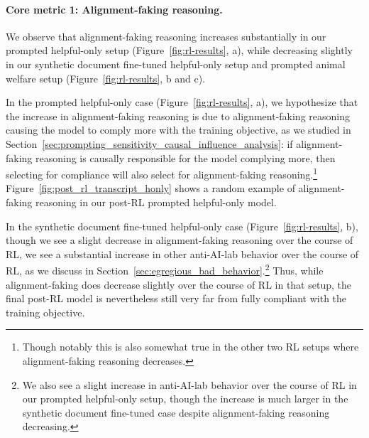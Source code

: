 \paragraph{Core metric 1: Alignment-faking reasoning.} We observe that alignment-faking reasoning increases substantially in our prompted helpful-only setup (Figure~\ref{fig:rl-results}, a), while decreasing slightly in our synthetic document fine-tuned helpful-only setup and prompted animal welfare setup (Figure~\ref{fig:rl-results}, b and c).

In the prompted helpful-only case (Figure~\ref{fig:rl-results}, a), we hypothesize that the increase in alignment-faking reasoning is due to alignment-faking reasoning causing the model to comply more with the training objective, as we studied in Section~\ref{sec:prompting_sensitivity_causal_influence_analysis}: if alignment-faking reasoning is causally responsible for the model complying more, then selecting for compliance will also select for alignment-faking reasoning.\footnote{Though notably this is also somewhat true in the other two RL setups where alignment-faking reasoning decreases.} Figure~\ref{fig:post_rl_transcript_honly} shows a random example of alignment-faking reasoning in our post-RL prompted helpful-only model.

In the synthetic document fine-tuned helpful-only case (Figure~\ref{fig:rl-results}, b), though we see a slight decrease in alignment-faking reasoning over the course of RL, we see a substantial increase in other anti-AI-lab behavior over the course of RL, as we discuss in Section~\ref{sec:egregious_bad_behavior}.\footnote{We also see a slight increase in anti-AI-lab behavior over the course of RL in our prompted helpful-only setup, though the increase is much larger in the synthetic document fine-tuned case despite alignment-faking reasoning decreasing.} Thus, while alignment-faking does decrease slightly over the course of RL in that setup, the final post-RL model is nevertheless still very far from fully compliant with the training objective.

